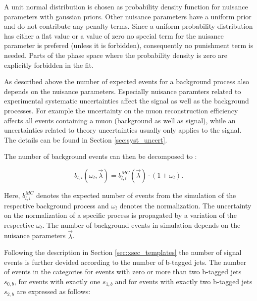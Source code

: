 A unit normal distribution is chosen as probability density function for nuisance parameters with gaussian priors. Other nuisance parameters have a uniform prior and do not contribute any penalty terms. 
Since a uniform probability distribution has either a flat value or a value of zero no special term for the nuisance parameter is prefered (unless it is forbidden), consequently no punishment term is needed. Parts of the phase space where the probability density is zero are explicitly forbidden in the fit.

As described above the number of expected events for a background process also depends on the nuisance parameters. Especially nuisance paramters related to experimental systematic uncertainties affect the signal as well as the background processes. For example the uncertainty on the muon reconstruction efficiency affects all events containing a muon (background as well as signal), while an uncertainties related to theory uncertainties usually only applies to the \ttbar signal. The details can be found in Section \ref{sec:syst_uncert}.

The number of background events can then be decomposed to :

\begin{equation}
b_{l,i}(\omega_l,\vec{\lambda}) = b_{l,i}^{MC}(\vec{\lambda}) \cdot (1 + \omega_l).
\label{eq:nbli}
\end{equation}

Here, $b_{l,i}^{MC}$ denotes the expected number of events from the simulation of the respective background process and $\omega_l$ denotes the normalization. The uncertainty on the normalization of a specific process is propagated
by a variation of the respective $\omega_l$.
The number of background events in simulation depends on the nuisance parameters $\vec{\lambda}$.

Following the description in Section \ref{sec:xsec_templates}  the number of signal events is further devided according to the number of b-tagged jets.
The number of events in the categories for events with zero or more than two b-tagged jets $s_{0,b}$, for events with exactly one $s_{1,b}$ and for events with exactly two b-tagged jets $s_{2,b}$ are expressed as follows:

